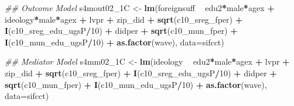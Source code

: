 \documentclass[
]{article}
\newenvironment{Shaded}{\begin{snugshade}}{\end{snugshade}}
\newcommand{\CommentTok}[1]{\textcolor[rgb]{0.56,0.35,0.01}{\textit{#1}}}
\newcommand{\DataTypeTok}[1]{\textcolor[rgb]{0.13,0.29,0.53}{#1}}
\newcommand{\DecValTok}[1]{\textcolor[rgb]{0.00,0.00,0.81}{#1}}
\newcommand{\KeywordTok}[1]{\textcolor[rgb]{0.13,0.29,0.53}{\textbf{#1}}}
\newcommand{\NormalTok}[1]{#1}
\newcommand{\OperatorTok}[1]{\textcolor[rgb]{0.81,0.36,0.00}{\textbf{#1}}}
\newcommand{\StringTok}[1]{\textcolor[rgb]{0.31,0.60,0.02}{#1}}
\begin{document}
\begin{Shaded}
\begin{Highlighting}[]
\CommentTok{## Outcome Model }
\NormalTok{s4mout02_1C <-}\StringTok{ }\KeywordTok{lm}\NormalTok{(foreignsuff  }\OperatorTok{~}\StringTok{ }\NormalTok{edu2}\OperatorTok{*}\NormalTok{male}\OperatorTok{*}\NormalTok{agex }\OperatorTok{+}\StringTok{ }\NormalTok{ideology}\OperatorTok{*}\NormalTok{male}\OperatorTok{*}\NormalTok{agex }\OperatorTok{+}\StringTok{ }\NormalTok{lvpr }\OperatorTok{+}\StringTok{  }
\StringTok{                    }\NormalTok{zip_did }\OperatorTok{+}\StringTok{ }\KeywordTok{sqrt}\NormalTok{(c10_sreg_fper) }\OperatorTok{+}\StringTok{ }\KeywordTok{I}\NormalTok{(c10_sreg_edu_ugsP}\OperatorTok{/}\DecValTok{10}\NormalTok{) }\OperatorTok{+}\StringTok{ }
\StringTok{                    }\NormalTok{didper }\OperatorTok{+}\StringTok{ }\KeywordTok{sqrt}\NormalTok{(c10_mun_fper) }\OperatorTok{+}\StringTok{ }\KeywordTok{I}\NormalTok{(c10_mun_edu_ugsP}\OperatorTok{/}\DecValTok{10}\NormalTok{) }\OperatorTok{+}\StringTok{ }
\StringTok{                    }\KeywordTok{as.factor}\NormalTok{(wave), }\DataTypeTok{data=}\NormalTok{sifcct)}

\CommentTok{## Mediator Model}
\NormalTok{s4mm02_1C <-}\StringTok{ }\KeywordTok{lm}\NormalTok{(ideology  }\OperatorTok{~}\StringTok{ }\NormalTok{edu2}\OperatorTok{*}\NormalTok{male}\OperatorTok{*}\NormalTok{agex }\OperatorTok{+}\StringTok{ }\NormalTok{lvpr }\OperatorTok{+}\StringTok{  }
\StringTok{                  }\NormalTok{zip_did }\OperatorTok{+}\StringTok{ }\KeywordTok{sqrt}\NormalTok{(c10_sreg_fper) }\OperatorTok{+}\StringTok{ }\KeywordTok{I}\NormalTok{(c10_sreg_edu_ugsP}\OperatorTok{/}\DecValTok{10}\NormalTok{) }\OperatorTok{+}\StringTok{ }
\StringTok{                  }\NormalTok{didper }\OperatorTok{+}\StringTok{ }\KeywordTok{sqrt}\NormalTok{(c10_mun_fper) }\OperatorTok{+}\StringTok{ }\KeywordTok{I}\NormalTok{(c10_mun_edu_ugsP}\OperatorTok{/}\DecValTok{10}\NormalTok{) }\OperatorTok{+}\StringTok{ }
\StringTok{                  }\KeywordTok{as.factor}\NormalTok{(wave), }\DataTypeTok{data=}\NormalTok{sifcct)}


\end{Highlighting}
\end{Shaded}
\end{document}

